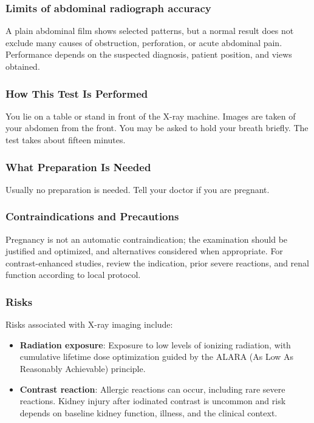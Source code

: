 \subsubsection*{Limits of abdominal radiograph accuracy}
A plain abdominal film shows selected patterns, but a normal result does not exclude many causes of obstruction, perforation, or acute abdominal pain. Performance depends on the suspected diagnosis, patient position, and views obtained.

\subsubsection*{How This Test Is Performed}
You lie on a table or stand in front of the X-ray machine. Images are taken of your abdomen from the front. You may be asked to hold your breath briefly. The test takes about fifteen minutes.

\subsubsection*{What Preparation Is Needed}
Usually no preparation is needed. Tell your doctor if you are pregnant.

\subsubsection*{Contraindications and Precautions}
Pregnancy is not an automatic contraindication; the examination should be justified and optimized, and alternatives considered when appropriate. For contrast-enhanced studies, review the indication, prior severe reactions, and renal function according to local protocol.

\subsubsection*{Risks}
Risks associated with X-ray imaging include:
\begin{itemize}
    \item \textbf{Radiation exposure}: Exposure to low levels of ionizing radiation, with cumulative lifetime dose optimization guided by the ALARA (As Low As Reasonably Achievable) principle.
    \item \textbf{Contrast reaction}: Allergic reactions can occur, including rare severe reactions. Kidney injury after iodinated contrast is uncommon and risk depends on baseline kidney function, illness, and the clinical context.
\end{itemize}


